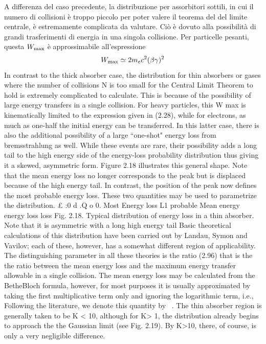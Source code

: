 {\begin{approfondimento}
        A differenza del caso precedente, la distribuzione per assorbitori sottili, in cui il numero di collisioni è troppo piccolo per poter valere il teorema del del limite centrale, è estremamente complicata da valutare. Ciò è dovuto alla possibilità di grandi trasferimenti di energia in una singola collisione. Per particelle pesanti, questa $W_{\rm max}$ è approssimabile all'espressione
        \begin{equation*}
            W_{\rm max} \simeq 2 m_e c^2 (\beta\gamma)^2
        \end{equation*}
        In contrast to the thick absorber case, the distribution for thin absorbers or gases where
the number of collisions N is too small for the Central Limit Theorem to hold is extremely
complicated to calculate. This is because of the possibility of large energy
transfers in a single collision. For heavy particles, this W max is kinematically limited to
the expression given in (2.28), while for electrons, as much as one-half the initial energy
can be transferred. In this latter case, there is also the additional possibility of a large
``one-shot" energy loss from bremsstrahlung as well. While these events are rare, their
possibility adds a long tail to the high energy side of the energy-loss probability distribution
thus giving it a skewed, asymmetric form. Figure 2.18 illustrates this general
shape. Note that the mean energy loss no longer corresponds to the peak but is displaced
because of the high energy tail. In contrast, the position of the peak now defines
the most probable energy loss. These two quantities may be used to parametrize the
distribution.
£
:0
d
.Q
o
0.
Most Energy loss L1
probable Mean
energy energy
loss loss
Fig. 2.18. Typical distribution of energy loss in a
thin absorber. Note that it is asymmetric with a long
high energy tail
Basic theoretical calculations of this distribution have been carried out by Landau,
Symon and Vavilov; each of these, however, has a somewhat different region of applicability.
The distinguishing parameter in all these theories is the ratio
(2.96)
that is the the ratio between the mean energy loss and the maximum energy transfer allowable
in a single collision. The mean energy loss may be calculated from the BetheBloch
formula, however, for most purposes it is usually approximated by taking the
first multiplicative term only and ignoring the logarithmic term, i.e.,
        Following the literature, we denote this quantity by ~. The thin absorber region is
generally taken to be K < 10, although for K> 1, the distribution already begins to approach
the the Gaussian limit (see Fig. 2.19). By K>10, there, of course, is only a very
negligible difference.
    \end{approfondimento}
    
    } %

